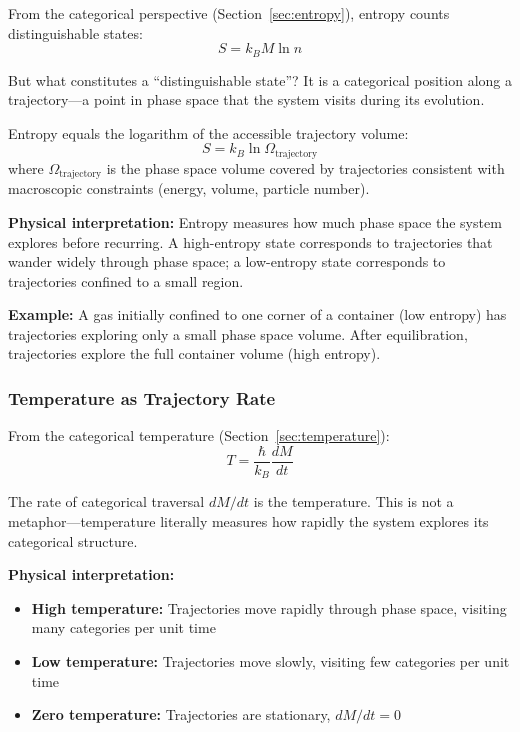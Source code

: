 From the categorical perspective (Section~\ref{sec:entropy}), entropy counts distinguishable states:
\begin{equation}
S = k_B M \ln n
\end{equation}

But what constitutes a ``distinguishable state''? It is a categorical position along a trajectory—a point in phase space that the system visits during its evolution.

\begin{proposition}
\label{prop:entropy_trajectory}
Entropy equals the logarithm of the accessible trajectory volume:
\begin{equation}
S = k_B \ln \Omega_{\text{trajectory}}
\end{equation}
where $\Omega_{\text{trajectory}}$ is the phase space volume covered by trajectories consistent with macroscopic constraints (energy, volume, particle number).
\end{proposition}

\textbf{Physical interpretation:} Entropy measures how much phase space the system explores before recurring. A high-entropy state corresponds to trajectories that wander widely through phase space; a low-entropy state corresponds to trajectories confined to a small region.

\textbf{Example:} A gas initially confined to one corner of a container (low entropy) has trajectories exploring only a small phase space volume. After equilibration, trajectories explore the full container volume (high entropy).


\subsubsection{Temperature as Trajectory Rate}

From the categorical temperature (Section~\ref{sec:temperature}):
\begin{equation}
T = \frac{\hbar}{k_B}\frac{dM}{dt}
\end{equation}

The rate of categorical traversal $dM/dt$ is the temperature. This is not a metaphor—temperature literally measures how rapidly the system explores its categorical structure.

\textbf{Physical interpretation:} 
\begin{itemize}
\item \textbf{High temperature:} Trajectories move rapidly through phase space, visiting many categories per unit time
\item \textbf{Low temperature:} Trajectories move slowly, visiting few categories per unit time
\item \textbf{Zero temperature:} Trajectories are stationary, $dM/dt = 0$
\end{itemize}

